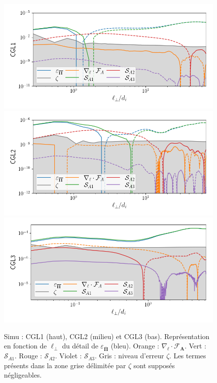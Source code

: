  \begin{figure}[!ht]
  \centering
  \includegraphics[width=0.9\linewidth,trim=0cm 0cm 0cm 0.5cm, clip=true]{./Mainmatter/Part_3/images_ch3/CGL1_compa_cgl}
 \includegraphics[width=0.9\linewidth,trim=0cm 0cm 0cm 0.5cm, clip=true]{./Mainmatter/Part_3/images_ch3/CGL2_compa_cgl}
  \includegraphics[width=0.9\linewidth,trim=0cm 0cm 0cm 0.5cm, clip=true]{./Mainmatter/Part_3/images_ch3/CGL3_compa_cgl}
 \cprotect\caption{Simu : CGL1 (haut), CGL2 (milieu) et  CGL3 (bas). Représentation  en fonction de \ensuremath{\ell_{\perp}} du détail de \ensuremath{\varepsilon_{\overline{\boldsymbol{\Pi}}}} (bleu). Orange : \ensuremath{\nabla_{\boldsymbol{\ell}} \cdot \boldsymbol{\mathcal{F}_A}}. Vert : \ensuremath{\mathcal{S}_{A1}}. Rouge : \ensuremath{\mathcal{S}_{A2}}. Violet : \ensuremath{\mathcal{S}_{A3}}. Gris : niveau d'erreur \ensuremath{\zeta}. Les termes présents dans la zone grise délimitée par \ensuremath{\zeta} sont supposés négligeables. }
 \label{fig:detail_simu_CGL1-2}
 \end{figure}
 
